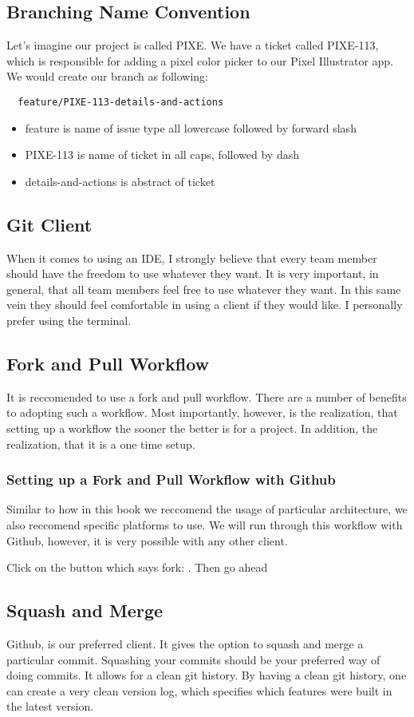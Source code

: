 \subsection { Branching Name Convention }
Let's imagine our project is called PIXE. We have a ticket called PIXE-113,
which is responsible for adding a pixel color picker to our Pixel Illustrator
app. We would create our branch as following:

\begin{verbatim}
  feature/PIXE-113-details-and-actions
\end{verbatim}

\begin{itemize}
  \item feature is name of issue type all lowercase followed by forward slash
  \item PIXE-113 is name of ticket in all caps, followed by dash
  \item details-and-actions is abstract of ticket
\end{itemize} 

\subsection { Git Client }
When it comes to using an IDE, I strongly believe that every team member should
have the freedom to use whatever they want. It is very important, in general,
that all team members feel free to use whatever they want. In this same vein
they should feel comfortable in using a client if they would like. I personally
prefer using the terminal.

\subsection { Fork and Pull Workflow }
It is reccomended to use a fork and pull workflow. There are a number of
benefits to adopting such a workflow. Most importantly, however, is the
realization, that setting up a workflow the sooner the better is for a project.
In addition, the realization, that it is a one time setup.

\subsubsection { Setting up a Fork and Pull Workflow with Github }
Similar to how in this book we reccomend the usage of particular architecture,
we also reccomend specific platforms to use. We will run through this workflow
with Github, however, it is very possible with any other client.

Click on the button which says fork: .
Then go ahead


\subsection { Squash and Merge }
Github, is our preferred client. It gives the option to squash and merge a
particular commit. Squashing your commits should be your preferred way of doing
commits. It allows for a clean git history. By having a clean git history, one
can create a very clean version log, which specifies which features were built
in the latest version.
